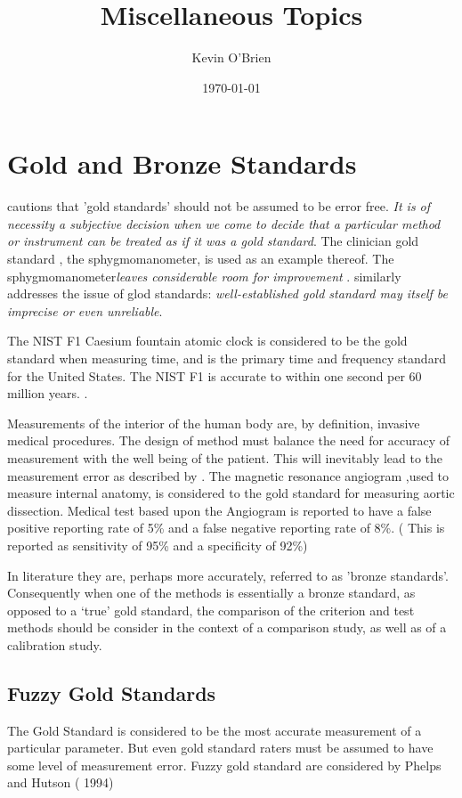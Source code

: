 \documentclass[12pt, a4paper]{article}
\begin{document}
\author{Kevin O'Brien}
\title{Miscellaneous Topics}
\date{\today}
\maketitle
\tableofcontents \setcounter{tocdepth}{2}

\newpage
\section{Gold and Bronze Standards}

\noindent \citet[p.47]{DunnSEME} cautions that 'gold standards' should not be assumed to be error free. \emph{It is of necessity a subjective decision when we come to decide that a particular method or instrument can be treated as if it was a gold standard}.
The clinician gold standard , the sphygmomanometer, is used as an example thereof.  The sphygmomanometer\emph{leaves considerable room for improvement} \citep{DunnSEME}. \citet{pizzi} similarly addresses the issue of glod standards: \emph{well-established gold standard may itself be imprecise or even unreliable}.


The NIST F1 Caesium fountain atomic clock is considered to be the gold standard when measuring time, and is the primary time and frequency standard for the United States. The NIST F1 is accurate
to within one second per 60 million years. \citep{NIST}.

Measurements of the interior of the human body are, by definition, invasive medical procedures. The design of method must balance the need for accuracy of measurement with the well being of the patient. This will inevitably lead to the measurement error as described by \citet{DunnSEME}. The magnetic resonance angiogram ,used to measure internal anatomy,  is considered to the gold standard for measuring aortic dissection. Medical test based upon the Angiogram is reported to have a false positive reporting rate of 5\% and a false negative reporting rate of 8\%. ( This is
reported as sensitivity of 95\% and a specificity of 92\%)
\citep{ACR}

In literature they are, perhaps more accurately, referred to as
'bronze standards'. Consequently when one of the methods is
essentially a bronze standard, as opposed to a `true' gold
standard, the comparison of the criterion and test methods should
be consider in the context of a comparison study, as well as of a
calibration study.



\subsection{Fuzzy Gold Standards} The Gold Standard is considered to be the most
accurate measurement of a particular parameter. But even gold
standard raters must be assumed to have some level of measurement
error. Fuzzy gold standard are considered by Phelps and Hutson (
1994)
\end{document}
